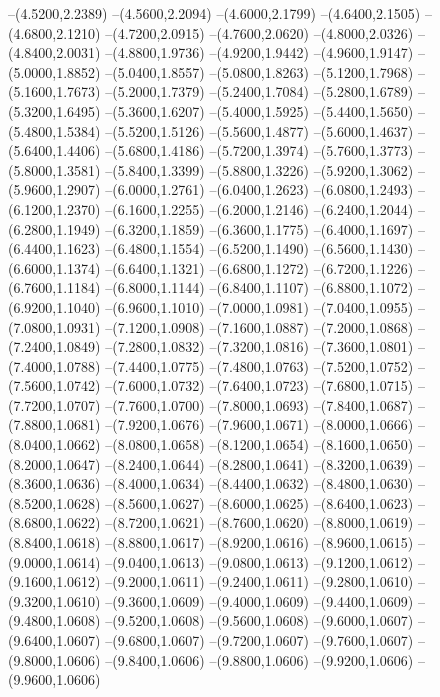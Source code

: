 {	--(4.5200,2.2389)
	--(4.5600,2.2094)
	--(4.6000,2.1799)
	--(4.6400,2.1505)
	--(4.6800,2.1210)
	--(4.7200,2.0915)
	--(4.7600,2.0620)
	--(4.8000,2.0326)
	--(4.8400,2.0031)
	--(4.8800,1.9736)
	--(4.9200,1.9442)
	--(4.9600,1.9147)
	--(5.0000,1.8852)
	--(5.0400,1.8557)
	--(5.0800,1.8263)
	--(5.1200,1.7968)
	--(5.1600,1.7673)
	--(5.2000,1.7379)
	--(5.2400,1.7084)
	--(5.2800,1.6789)
	--(5.3200,1.6495)
	--(5.3600,1.6207)
	--(5.4000,1.5925)
	--(5.4400,1.5650)
	--(5.4800,1.5384)
	--(5.5200,1.5126)
	--(5.5600,1.4877)
	--(5.6000,1.4637)
	--(5.6400,1.4406)
	--(5.6800,1.4186)
	--(5.7200,1.3974)
	--(5.7600,1.3773)
	--(5.8000,1.3581)
	--(5.8400,1.3399)
	--(5.8800,1.3226)
	--(5.9200,1.3062)
	--(5.9600,1.2907)
	--(6.0000,1.2761)
	--(6.0400,1.2623)
	--(6.0800,1.2493)
	--(6.1200,1.2370)
	--(6.1600,1.2255)
	--(6.2000,1.2146)
	--(6.2400,1.2044)
	--(6.2800,1.1949)
	--(6.3200,1.1859)
	--(6.3600,1.1775)
	--(6.4000,1.1697)
	--(6.4400,1.1623)
	--(6.4800,1.1554)
	--(6.5200,1.1490)
	--(6.5600,1.1430)
	--(6.6000,1.1374)
	--(6.6400,1.1321)
	--(6.6800,1.1272)
	--(6.7200,1.1226)
	--(6.7600,1.1184)
	--(6.8000,1.1144)
	--(6.8400,1.1107)
	--(6.8800,1.1072)
	--(6.9200,1.1040)
	--(6.9600,1.1010)
	--(7.0000,1.0981)
	--(7.0400,1.0955)
	--(7.0800,1.0931)
	--(7.1200,1.0908)
	--(7.1600,1.0887)
	--(7.2000,1.0868)
	--(7.2400,1.0849)
	--(7.2800,1.0832)
	--(7.3200,1.0816)
	--(7.3600,1.0801)
	--(7.4000,1.0788)
	--(7.4400,1.0775)
	--(7.4800,1.0763)
	--(7.5200,1.0752)
	--(7.5600,1.0742)
	--(7.6000,1.0732)
	--(7.6400,1.0723)
	--(7.6800,1.0715)
	--(7.7200,1.0707)
	--(7.7600,1.0700)
	--(7.8000,1.0693)
	--(7.8400,1.0687)
	--(7.8800,1.0681)
	--(7.9200,1.0676)
	--(7.9600,1.0671)
	--(8.0000,1.0666)
	--(8.0400,1.0662)
	--(8.0800,1.0658)
	--(8.1200,1.0654)
	--(8.1600,1.0650)
	--(8.2000,1.0647)
	--(8.2400,1.0644)
	--(8.2800,1.0641)
	--(8.3200,1.0639)
	--(8.3600,1.0636)
	--(8.4000,1.0634)
	--(8.4400,1.0632)
	--(8.4800,1.0630)
	--(8.5200,1.0628)
	--(8.5600,1.0627)
	--(8.6000,1.0625)
	--(8.6400,1.0623)
	--(8.6800,1.0622)
	--(8.7200,1.0621)
	--(8.7600,1.0620)
	--(8.8000,1.0619)
	--(8.8400,1.0618)
	--(8.8800,1.0617)
	--(8.9200,1.0616)
	--(8.9600,1.0615)
	--(9.0000,1.0614)
	--(9.0400,1.0613)
	--(9.0800,1.0613)
	--(9.1200,1.0612)
	--(9.1600,1.0612)
	--(9.2000,1.0611)
	--(9.2400,1.0611)
	--(9.2800,1.0610)
	--(9.3200,1.0610)
	--(9.3600,1.0609)
	--(9.4000,1.0609)
	--(9.4400,1.0609)
	--(9.4800,1.0608)
	--(9.5200,1.0608)
	--(9.5600,1.0608)
	--(9.6000,1.0607)
	--(9.6400,1.0607)
	--(9.6800,1.0607)
	--(9.7200,1.0607)
	--(9.7600,1.0607)
	--(9.8000,1.0606)
	--(9.8400,1.0606)
	--(9.8800,1.0606)
	--(9.9200,1.0606)
	--(9.9600,1.0606)
}
